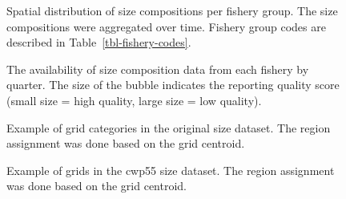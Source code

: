\documentclass[
]{scrartcl}
\begin{document}
\newpage{}

\begin{figure}


\caption{\label{fig-size-grid}Spatial distribution of size compositions
per fishery group. The size compositions were aggregated over time.
Fishery group codes are described in Table~\ref{tbl-fishery-codes}.}

\end{figure}%

\newpage{}

\begin{figure}


\caption{\label{fig-rq-size}The availability of size composition data
from each fishery by quarter. The size of the bubble indicates the
reporting quality score (small size = high quality, large size = low
quality).}

\end{figure}%

\newpage{}

\begin{figure}


\caption{\label{fig-map-grid-agg1}Example of grid categories in the
original size dataset. The region assignment was done based on the grid
centroid.}

\end{figure}%

\newpage{}

\begin{figure}


\caption{\label{fig-map-grid-agg2}Example of grids in the cwp55 size
dataset. The region assignment was done based on the grid centroid.}

\end{figure}%
\end{document}
